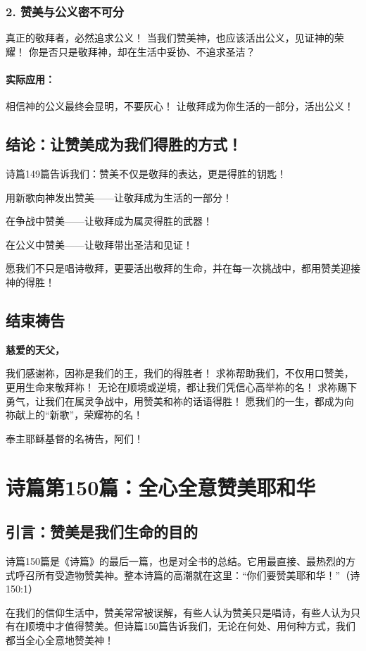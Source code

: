 \documentclass[a4paper, 12pt]{article}
\begin{document}
\subsubsection*{2. 赞美与公义密不可分}
真正的敬拜者，必然追求公义！
当我们赞美神，也应该活出公义，见证神的荣耀！
你是否只是敬拜神，却在生活中妥协、不追求圣洁？
\paragraph*{实际应用：}
相信神的公义最终会显明，不要灰心！
让敬拜成为你生活的一部分，活出公义！
\subsection*{结论：让赞美成为我们得胜的方式！}
诗篇149篇告诉我们：赞美不仅是敬拜的表达，更是得胜的钥匙！

用新歌向神发出赞美——让敬拜成为生活的一部分！

在争战中赞美——让敬拜成为属灵得胜的武器！

在公义中赞美——让敬拜带出圣洁和见证！

愿我们不只是唱诗敬拜，更要活出敬拜的生命，并在每一次挑战中，都用赞美迎接神的得胜！

\subsection*{结束祷告}
\textbf{慈爱的天父，}

我们感谢祢，因祢是我们的王，我们的得胜者！
求祢帮助我们，不仅用口赞美，更用生命来敬拜祢！
无论在顺境或逆境，都让我们凭信心高举祢的名！
求祢赐下勇气，让我们在属灵争战中，用赞美和祢的话语得胜！
愿我们的一生，都成为向祢献上的“新歌”，荣耀祢的名！

奉主耶稣基督的名祷告，阿们！
\newpage
\section{诗篇第150篇：全心全意赞美耶和华}
\subsection*{引言：赞美是我们生命的目的}
\hspace{0.6cm}诗篇150篇是《诗篇》的最后一篇，也是对全书的总结。它用最直接、最热烈的方式呼召所有受造物赞美神。整本诗篇的高潮就在这里：“你们要赞美耶和华！”（诗150:1）

在我们的信仰生活中，赞美常常被误解，有些人认为赞美只是唱诗，有些人认为只有在顺境中才值得赞美。但诗篇150篇告诉我们，无论在何处、用何种方式，我们都当全心全意地赞美神！
\end{document}
